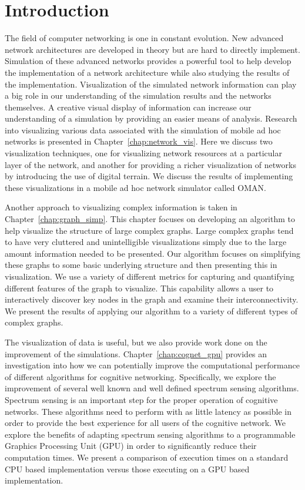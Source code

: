 \chapter{Introduction}

The field of computer networking is one in constant evolution.  New advanced network architectures are developed in theory but are hard to directly implement.  Simulation of these advanced networks provides a powerful tool to help develop the implementation of a network architecture while also studying the results of the implementation.  Visualization of the simulated network information can play a big role in our understanding of the simulation results and the networks themselves.  A creative visual display of information can increase our understanding of a simulation by providing an easier means of analysis.  Research into visualizing various data associated with the simulation of mobile ad hoc networks is presented in Chapter~\ref{chap:network_vis}.  Here we discuss two visualization techniques, one for visualizing network resources at a particular layer of the network, and another for providing a richer visualization of networks by introducing the use of digital terrain.  We discuss the results of implementing these visualizations in a mobile ad hoc network simulator called OMAN.

Another approach to visualizing complex information is taken in Chapter~\ref{chap:graph_simp}.  This chapter focuses on developing an algorithm to help visualize the structure of large complex graphs.  Large complex graphs tend to have very cluttered and unintelligible visualizations simply due to the large amount information needed to be presented.  Our algorithm focuses on simplifying these graphs to some basic underlying structure and then presenting this in visualization.  We use a variety of different metrics for capturing and quantifying different features of the graph to visualize.  This capability allows a user to interactively discover key nodes in the graph and examine their interconnectivity.  We present the results of applying our algorithm to a variety of different types of complex graphs.

The visualization of data is useful, but we also provide work done on the improvement of the simulations.  Chapter~\ref{chap:cognet_gpu} provides an investigation into how we can potentially improve the computational performance of different algorithms for cognitive networking.  Specifically, we explore the improvement of several well known and well defined spectrum sensing algorithms.  Spectrum sensing is an important step for the proper operation of cognitive networks.  These algorithms need to perform with as little latency as possible in order to provide the best experience for all users of the cognitive network.  We explore the benefits of adapting spectrum sensing algorithms to a programmable Graphics Processing Unit (GPU) in order to significantly reduce their computation times.  We present a comparison of execution times on a standard CPU based implementation versus those executing on a GPU based implementation. 
